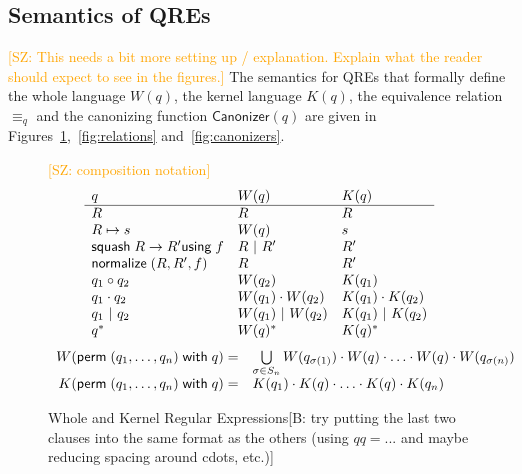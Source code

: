 \documentclass{svproc}
\newcommand{\FINISH}[3]{\ifdraft\textcolor{#1}{[#2: #3]}\fi}
\newcommand{\bcp}[1]{\FINISH{dkred}{B}{#1}}
\newcommand{\saz}[1]{\FINISH{orange}{SZ}{#1}}
\newcommand{\kw}[1]{\ensuremath{\mathsf{#1}}}
\newcommand{\squash}[3]{\ensuremath{\kw{squash} \; #1 \rightarrow #2
\kw{using} \; #3}}
\newcommand{\perm}[2]{\ensuremath{\kw{perm}\; (#1)\; \kw{with}\; #2}}
\newcommand{\normalize}[3]{\ensuremath{\kw{normalize} \; (#1, #2, #3)}}
\newcommand{\sep}{\ensuremath{\ | \ }}
\newcommand{\canonizer}{\ensuremath{\kw{Canonizer}}}
\newcommand{\eqrel}[1]{\ensuremath{\equiv_{#1}}}
\begin{document}
\subsection{Semantics of QREs}

\saz{This needs a bit more setting up / explanation. Explain what the reader
  should expect to see in the figures.}
The semantics for QREs that formally define the whole language $W(q)$, the
kernel language $K(q)$, the equivalence relation $\eqrel{q}$ and the
canonizing function $\canonizer(q)$ are given in
Figures~\ref{fig:wk},~\ref{fig:relations} and~\ref{fig:canonizers}.
\begin{figure}[t]
\saz{composition notation}
  \centering
  \[
    \begin{array}{l@{\quad}l@{\quad}l}
   
      q & W(q) & K(q) \\ \hline
      R & R & R \\
      R \mapsto s & W(q) & s \\
      \squash{R}{R'}{f} & R \sep R' & R' \\
      \normalize{R}{R'}{f} & R & R' \\
      q_1 \circ  q_2 & W(q_2) & K(q_1) \\
      q_1 \cdot q_2 & W(q_1) \cdot W(q_2) & K(q_1) \cdot K(q_2) \\
      q_1 \sep q_2 & W(q_1) \sep W(q_2) & K(q_1) \sep K(q_2) \\
      q^* & W(q)^* & K(q)^* \\
    \end{array}
  \]
\[
\begin{array}{r@{\quad}l}
W( \perm{q_1, \ldots, q_n}{q} ) = &
\bigcup \limits_{\sigma \in S_n} W(q_{\sigma(1)}) \cdot W(q) \cdot \ldots \cdot
W(q) \cdot W(q_{\sigma(n)})
\\
K( \perm{q_1, \ldots, q_n}{q} ) = &
 K(q_1) \cdot K(q) \cdot \ldots \cdot K(q) \cdot K(q_n) 
\end{array}
\]
  \caption{Whole and Kernel Regular Expressions\bcp{try putting the 
      last two clauses into the same format as the
      others (using $\mathit{qq} = ...$ and maybe reducing spacing around
      cdots, etc.)}}
  \label{fig:wk}
\end{figure}
\end{document}
